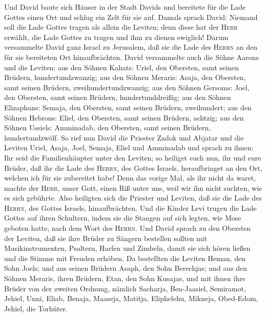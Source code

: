 Und David baute sich Häuser in der Stadt Davids und
bereitete für die Lade Gottes einen Ort und schlug ein Zelt für sie auf.
 Damals sprach David: Niemand soll die Lade Gottes tragen
als allein die Leviten; denn diese hat der \textsc{Herr} erwählt, die
Lade Gottes zu tragen und ihm zu dienen ewiglich!  Darum
versammelte David ganz Israel zu Jerusalem, daß sie die Lade des
\textsc{Herrn} an den für sie bereiteten Ort hinaufbrächten.
 David versammelte auch die Söhne Aarons und die Leviten;
 aus den Söhnen Kahats: Uriel, den Obersten, samt seinen
Brüdern, hundertundzwanzig;  aus den Söhnen Meraris:
Asaja, den Obersten, samt seinen Brüdern, zweihundertundzwanzig;
 aus den Söhnen Gersoms: Joel, den Obersten, samt seinen
Brüdern, hundertunddreißig;  aus den Söhnen Elizaphans:
Semaja, den Obersten, samt seinen Brüdern, zweihundert; 
aus den Söhnen Hebrons: Eliel, den Obersten, samt seinen Brüdern,
achtzig;  aus den Söhnen Ussiels: Amminadab, den
Obersten, samt seinen Brüdern, hundertundzwölf.  So rief
nun David die Priester Zadok und Abjatar und die Leviten Uriel, Asaja,
Joel, Semaja, Eliel und Amminadab und sprach zu ihnen: 
Ihr seid die Familienhäupter unter den Leviten; so heiliget euch nun,
ihr und eure Brüder, daß ihr die Lade des \textsc{Herrn}, des Gottes
Israels, heraufbringet an den Ort, welchen ich für sie zubereitet habe!
 Denn das vorige Mal, als ihr nicht da waret, machte der
\textsc{Herr}, unser Gott, einen Riß unter uns, weil wir ihn nicht
suchten, wie es sich gebührte.  Also heiligten sich die
Priester und Leviten, daß sie die Lade des \textsc{Herrn}, des Gottes
Israels, hinaufbrächten.  Und die Kinder Levi trugen die
Lade Gottes auf ihren Schultern, indem sie die Stangen auf sich legten,
wie Mose geboten hatte, nach dem Wort des \textsc{Herrn}.
 Und David sprach zu den Obersten der Leviten, daß sie
ihre Brüder zu Sängern bestellen sollten mit Musikinstrumenten,
Psaltern, Harfen und Zimbeln, damit sie sich hören ließen und die Stimme
mit Freuden erhöben.  Da bestellten die Leviten Heman,
den Sohn Joels; und aus seinen Brüdern Asaph, den Sohn Berechjas; und
aus den Söhnen Meraris, ihren Brüdern, Etan, den Sohn Kusajas,
 und mit ihnen ihre Brüder von der zweiten Ordnung,
nämlich Sacharja, Ben-Jaasiel, Semiramot, Jehiel, Unni, Eliab, Benaja,
Maaseja, Matitja, Eliphelehu, Mikneja, Obed-Edom, Jehiel, die Torhüter.
